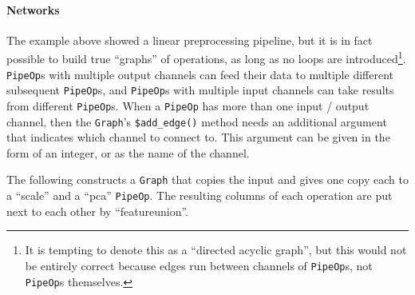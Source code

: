 \documentclass[]{article}
\let\oldparagraph\paragraph
\renewcommand{\paragraph}[1]{\oldparagraph{#1}\mbox{}}
\begin{document}
\hypertarget{networks}{%
\paragraph{Networks}\label{networks}}

The example above showed a linear preprocessing pipeline, but it is in fact possible to build true ``graphs'' of operations, as long as no loops are introduced\footnote{It is tempting to denote this as a ``directed acyclic graph'', but this would not be entirely correct because edges run between channels of \texttt{PipeOp}s, not \texttt{PipeOp}s themselves.}.
\texttt{PipeOp}s with multiple output channels can feed their data to multiple different subsequent \texttt{PipeOp}s, and \texttt{PipeOp}s with multiple input channels can take results from different \texttt{PipeOp}s.
When a \texttt{PipeOp} has more than one input / output channel, then the \texttt{Graph}'s \texttt{\$add\_edge()} method needs an additional argument that indicates which channel to connect to.
This argument can be given in the form of an integer, or as the name of the channel.

The following constructs a \texttt{Graph} that copies the input and gives one copy each to a ``scale'' and a ``pca'' \texttt{PipeOp}.
The resulting columns of each operation are put next to each other by ``featureunion''.
\end{document}
